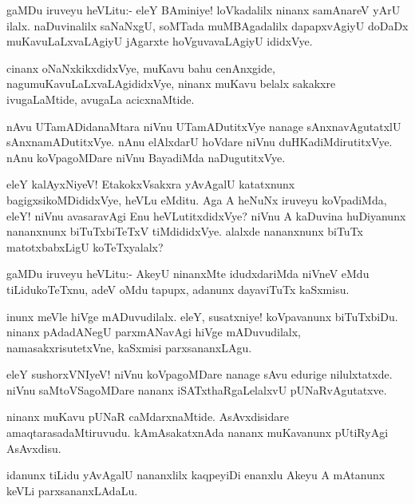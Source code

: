 \documentclass{article}
\begin{document}
\begin{mn}
gaMDu iruveyu heVLitu:- eleY BAminiye! loVkadalilx ninanx samAnareV
yArU ilalx. naDuvinalilx saNaNxgU, soMTada muMBAgadalilx dapapxvAgiyU
doDaDx muKavuLaLxvaLAgiyU jAgarxte hoVguvavaLAgiyU ididxVye.
\end{mn}

\begin{mn}
cinanx oNaNxkikxdidxVye, muKavu bahu cenAnxgide,
nagumuKavuLaLxvaLAgididxVye, ninanx muKavu belalx sakakxre
ivugaLaMtide, avugaLa acicxnaMtide.
\end{mn}

\begin{mn}
nAvu UTamADidanaMtara niVnu UTamADutitxVye nanage sAnxnavAgutatxlU
sAnxnamADutitxVye. nAnu elAlxdarU hoVdare niVnu
duHKadiMdirutitxVye. nAnu koVpagoMDare niVnu BayadiMda naDugutitxVye.
\end{mn}

\begin{mn}%
eleY kalAyxNiyeV! EtakokxVsakxra yAvAgalU katatxnunx
bagigxsikoMDididxVye, heVLu eMditu. Aga A heNuNx iruveyu koVpadiMda,
eleY! niVnu avasaravAgi Enu heVLutitxdidxVye? niVnu A kaDuvina
huDiyanunx nananxnunx biTuTxbiTeTxV tiMdididxVye. alalxde nananxnunx
biTuTx matotxbabxLigU koTeTxyalalx?
\end{mn}

\begin{mn}
gaMDu iruveyu heVLitu:- AkeyU ninanxMte idudxdariMda niVneV eMdu
tiLidukoTeTxnu, adeV oMdu tapupx, adanunx dayaviTuTx kaSxmisu.
\end{mn}

\begin{mn}
inunx meVle hiVge mADuvudilalx. eleY, susatxniye! koVpavanunx
biTuTxbiDu. ninanx pAdadANegU parxmANavAgi hiVge mADuvudilalx,
namasakxrisutetxVne, kaSxmisi parxsananxLAgu.
\end{mn}

\begin{mn}
eleY sushorxVNIyeV! niVnu koVpagoMDare nanage sAvu edurige
nilulxtatxde. niVnu saMtoVSagoMDare nananx iSATxthaRgaLelalxvU pUNaRvAgutatxve.
\end{mn}

\begin{mn}%
ninanx muKavu pUNaR caMdarxnaMtide. AsAvxdisidare
amaqtarasadaMtiruvudu. kAmAsakatxnAda nananx muKavanunx pUtiRyAgi AsAvxdisu.
\end{mn}

\begin{mn}
idanunx tiLidu yAvAgalU nananxlilx kaqpeyiDi enanxlu Akeyu A mAtanunx
keVLi parxsananxLAdaLu.
\end{mn}
\end{document}
